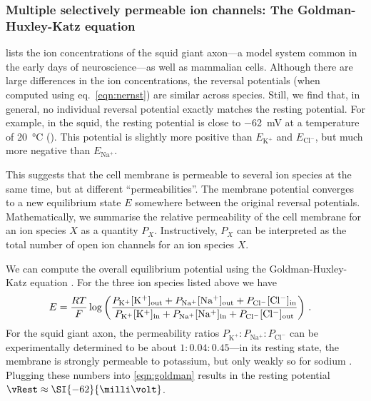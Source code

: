 \subsubsection{Multiple selectively permeable ion channels: The Goldman-Huxley-Katz equation}
 lists the ion concentrations of the squid giant axon---a model system common in the early days of neuroscience---as well as mammalian cells.
Although there are large differences in the ion concentrations, the reversal potentials (when computed using eq.~\ref{eqn:nernst}) are similar across species.
Still, we find that, in general, no individual reversal potential exactly matches the resting potential.
For example, in the squid, the resting potential is close to \SI{-62}{\milli\volt} at a temperature of \SI{20}{\degreeCelsius} (\cite{mccormick2014membrane}).
This potential is slightly more positive than $E_\mathrm{K^+}$ and $E_\mathrm{Cl^-}$, but much more negative than $E_\mathrm{Na^+}$.

This suggests that the cell membrane is permeable to several ion species at the same time, but at different \enquote{permeabilities}.
The membrane potential converges to a new equilibrium state $E$ somewhere between the original reversal potentials.
Mathematically, we summarise the relative permeability of the cell membrane for an ion species $X$ as a quantity $P_X$.
Instructively, $P_X$ can be interpreted as the total number of open ion channels for an ion species $X$.

We can compute the overall equilibrium potential using the Goldman-Huxley-Katz equation \citep{goldman1943potential,hodgkin1949effect}.
For the three ion species listed above we have
\begin{align}
	E &= \frac{RT}{F} \log \left( \frac{
		P_\mathrm{K^+} [\mathrm{K^+}]_\mathrm{out} +
		P_\mathrm{Na^+} [\mathrm{Na^+}]_\mathrm{out} +
		P_\mathrm{Cl^-} [\mathrm{Cl^-}]_\mathrm{in}}{
		P_\mathrm{K^+} [\mathrm{K^+}]_\mathrm{in} +
		P_\mathrm{Na^+} [\mathrm{Na^+}]_\mathrm{in} +
		P_\mathrm{Cl^-} [\mathrm{Cl^-}]_\mathrm{out}
		} \right) \,.
	\label{eqn:goldman}
\end{align}
For the squid giant axon, the permeability ratios $P_\mathrm{K^+} : P_\mathrm{Na^+} : P_\mathrm{Cl^-}$ can be experimentally determined to be about $1: 0.04 : 0.45$---in its resting state, the membrane is strongly permeable to potassium, but only weakly so for sodium \citep{mccormick2014membrane}.
Plugging these numbers into \cref{eqn:goldman} results in the resting potential $\vRest \approx \SI{-62}{\milli\volt}$.

